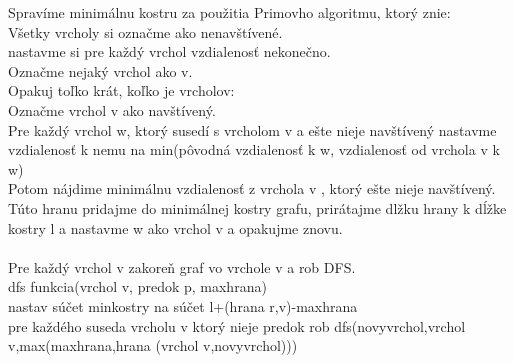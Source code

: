 \documentclass[a4paper,11pt]{article}
\begin{document}
Spravíme minimálnu kostru za použitia Primovho algoritmu, ktorý znie:\\
Všetky vrcholy si označme ako nenavštívené.\\
nastavme si pre každý vrchol vzdialenosť nekonečno.\\
Označme nejaký vrchol ako v.\\
Opakuj toľko krát, koľko je vrcholov:\\
Označme vrchol v ako navštívený.\\
Pre každý vrchol w, ktorý susedí s vrcholom v a ešte nieje navštívený nastavme vzdialenosť k nemu na min(pôvodná vzdialenosť k w, vzdialenosť od vrchola v k w)\\
Potom nájdime minimálnu vzdialenosť z vrchola v , ktorý ešte nieje navštívený.\\
Túto hranu pridajme do minimálnej kostry grafu, prirátajme dlžku hrany k dĺžke kostry l a nastavme w ako  vrchol v a opakujme znovu.\\
\\
Pre každý vrchol v zakoreň graf vo vrchole v a rob DFS.\\


dfs funkcia(vrchol v, predok p, maxhrana)\\
nastav súčet minkostry na súčet l+(hrana r,v)-maxhrana\\
pre každého suseda vrcholu v ktorý nieje predok rob dfs(novyvrchol,vrchol v,max(maxhrana,hrana (vrchol v,novyvrchol)))\\
 
\end{document}
